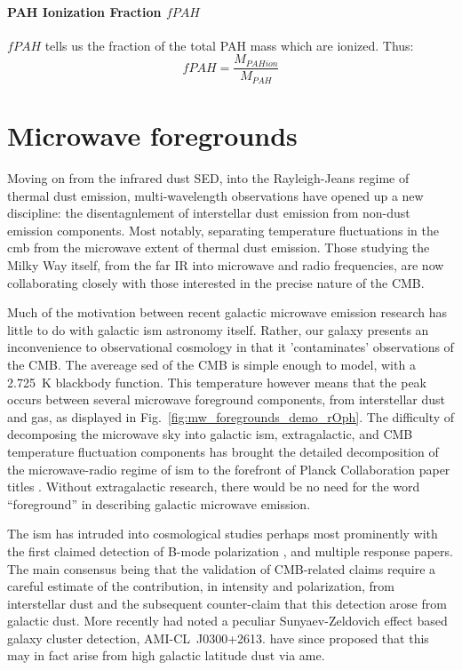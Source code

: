       \paragraph{PAH Ionization Fraction $fPAH$}
       $fPAH$ tells us the fraction of the total PAH mass which are ionized. Thus:
         \begin{equation}
           fPAH = \frac{M_{PAHion}}{M_{PAH}}
         \end{equation}


\section{Microwave foregrounds}
    Moving on from the infrared dust SED, into the Rayleigh-Jeans regime of thermal dust emission, multi-wavelength observations have opened up a new discipline: the disentagnlement of interstellar dust emission from non-dust emission components. Most notably, separating temperature fluctuations in the \gls{cmb} from the microwave extent of thermal dust emission. Those studying the Milky Way itself, from the far IR into microwave and radio frequencies, are now collaborating closely with those interested in the precise nature of the CMB.

    Much of the motivation between recent galactic microwave emission research has little to do with galactic \gls{ism} astronomy itself. Rather, our galaxy presents an inconvenience to observational cosmology in that it 'contaminates' observations of the CMB. The avereage \gls{sed} of the CMB is simple enough to model, with a 2.725~K blackbody function. This temperature however means that the peak occurs between several microwave foreground components, from interstellar dust and gas, as displayed in Fig.~\ref{fig:mw_foregrounds_demo_rOph}. The difficulty of decomposing the microwave sky into galactic \gls{ism}, extragalactic, and CMB temperature fluctuation components has brought the detailed decomposition of the microwave-radio regime of \gls{ism} to the forefront of Planck Collaboration paper titles \citep{planckEarly11I,planck2013I,planck2015I}. Without extragalactic research, there would be no need for the word ``foreground'' in describing galactic microwave emission.

    The \gls{ism} has intruded into cosmological studies perhaps most prominently with the first claimed detection of B-mode polarization \citep{hanson13, bicep214, flauger14}, and multiple response papers. The main consensus being that the validation of CMB-related claims require a careful estimate of the contribution, in intensity and polarization, from interstellar dust and the subsequent counter-claim that this detection arose from galactic dust\citep{planckIntL17, sheehy17}. More recently \cite{shimwell12} had noted a peculiar Sunyaev-Zeldovich effect based galaxy cluster detection, AMI-CL~J0300+2613. \cite{perrott18} have since proposed that this may in fact arise from high galactic latitude dust via \gls{ame}.

